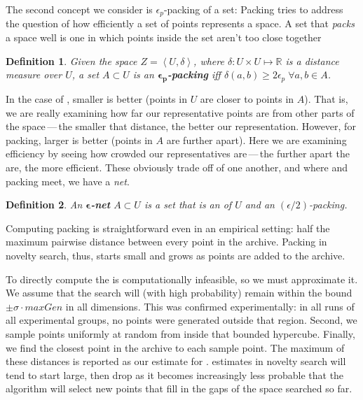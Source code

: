 \documentclass[twoside]{article}
\newtheorem{definition}{Definition}
\newcommand{\IR}{\mathbb{R}}
\begin{document}
The second concept we consider is $\epsilon_p$-packing of a set:  Packing tries to address the question of how efficiently a set of points represents a space.  A set that \emph{packs} a space well is one in which points inside the set aren't too close together

\begin{definition}
Given the space $Z=\left\langle U, \delta\right\rangle$, where $\delta: U\times U \mapsto \IR$ is a distance measure over $U$, a set $A\subset U$ is an $\boldsymbol{\epsilon_p}$\textbf{-packing} iff $\delta(a,b) \geq 2\epsilon_p \; \forall a,b \in A$. 
\end{definition}

In the case of , smaller is better (points in $U$ are closer to points in $A$).  That is, we are really examining how far our representative points are from other parts of the space\,---\,the smaller that distance, the better our representation.  However, for packing, larger is better (points in $A$ are further apart).  Here we are examining efficiency by seeing how crowded our representatives are\,---\,the further apart the are, the more efficient.  These obviously trade off of one another, and where  and packing meet, we have a \emph{net}.  

\begin{definition}
An $\boldsymbol{\epsilon}$\textbf{-net} $A \subset U$ is a set that is an  of $U$ and an $(\epsilon/2)$-packing.
\end{definition}
%

Computing packing is straightforward even in an empirical setting:  half the maximum pairwise distance between every point in the archive.  Packing in novelty search, thus, starts small and grows as points are added to the archive. 

To directly compute the  is computationally infeasible, so we must approximate it.  We assume that the search will (with high probability) remain within the bound $\pm\sigma\cdot maxGen$ in all dimensions.  This was confirmed experimentally:  in all runs of all experimental groups, no points were generated outside that region.  Second, we sample points uniformly at random from inside that bounded hypercube.  Finally, we find the closest point in the archive to each sample point. The maximum of these distances is reported as our estimate for .   estimates in novelty search will tend to start large, then drop as it becomes increasingly less probable that the algorithm will select new points that fill in the gaps of the space searched so far.
\end{document}
